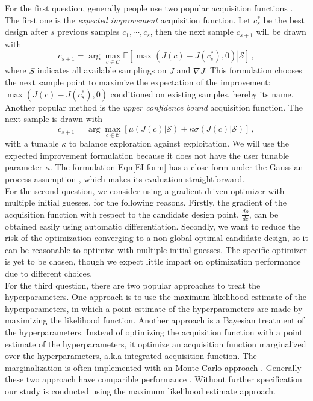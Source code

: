 \documentclass[a4paper,onecolumn]{article}
\theoremstyle{remark}
\begin{document}
\noindent For the first question, generally people use two popular acquisition functions
\cite{practicalBayesianopt}.
The first one is the \emph{expected improvement} acquisition function.
Let $c^*_s$ be the best design after $s$ previous samples $c_1, \cdots, c_s$, then the next sample 
$c_{s+1}$ will be drawn with
\begin{equation}
    c_{s+1} = \arg\max_{c\in\mathcal{C}} \mathbb{E}
    \left[\left. \max\left(J(c) - J(c^*_s), 0\right) \right| \mathcal{S}\right]\,,
    \label{EI form}
\end{equation}
where $S$ indicates all available samplings on $J$ and $\nabla \tilde{J}$.
This formulation chooses the next sample point to maximize the expectation of
the improvement: $\max \left(J(c) - J(c^*_s) , 0\right)$ conditioned on existing
samples, hereby its name.
Another popular method is the \emph{upper confidence bound} acquisition function.
The next sample is drawn with
\begin{equation}
    c_{s+1} = \arg\max_{c\in\mathcal{C}} \left[ \mu(J(c)\big|\mathcal{S}) +\kappa \sigma(J(c)\big|\mathcal{S}) \right]\,,
\end{equation}
with a tunable $\kappa$ to balance exploration against exploitation. We will
use the expected improvement formulation because it does not have the user tunable
parameter $\kappa$. The formulation Eqn\eqref{EI form} has a close form under the Gaussian process
assumption \cite{practicalBayesianopt}, which makes its evaluation straightforward. 
\\

\noindent For the second question, we consider using a gradient-driven optimizer
with multiple initial guesses, for the following reasons. Firstly, the gradient of the 
acquisition function with respect to the candidate design point, $\frac{d\rho}{dc}$,
can be obtained easily using automatic differentiation. Secondly, we want to
reduce the risk of the optimization converging to a non-global-optimal candidate design,
so it can be reasonable to optimize with multiple initial guesses.
The specific optimizer is yet to be chosen, though we expect little impact 
on optimization performance
due to different choices.
\\

\noindent For the third question, there are two popular approaches to treat
the hyperparameters. One approach is to use the maximum likelihood estimate of the
hyperparameters, in which a point estimate of the hyperparameters are made by maximizing 
the likelihood function. Another approach is a Bayesian treatment of the hyperparameters.
Instead of optimizing the acquisition function with a point estimate of the hyperparameters,
it optimize an acquisition function marginalized over the hyperparameters, a.k.a 
integrated acquisition function. The marginalization is often implemented with an Monte
Carlo approach \cite{MCMC hyperparameters}. Generally these two approach have comparible 
performance \cite{practicalBayesianopt}. 
Without further specification our study is conducted using the maximum likelihood
estimate approach.
\\
\end{document}
